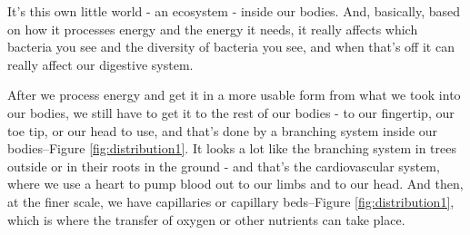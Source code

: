 \documentclass[]{article}
\begin{document}
It's this own little world -
an ecosystem - inside our bodies.
And, basically, based on how it processes
energy and the energy it needs,
it really affects which bacteria you see
and the diversity of bacteria you see,
and when that's off
it can really affect our digestive system.

After we process energy
and get it in a more usable form
from what we took into our bodies,
we still have to get it
to the rest of our bodies -
to our fingertip, our toe tip,
or our head to use,
and that's done by a branching system
inside our bodies--Figure \ref{fig:distribution1}.
It looks a lot like the branching system
in trees outside
or in their roots in the ground -
and that's the cardiovascular system,
where we use a heart to pump blood
out to our limbs and to our head.
And then, at the finer scale,
we have capillaries or capillary beds--Figure \ref{fig:distribution1},
which is where the transfer of oxygen
or other nutrients can take place.
\end{document}

